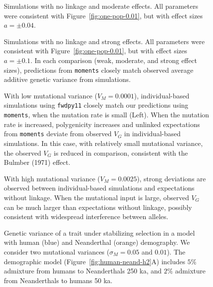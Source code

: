 \documentclass[10pt,letterpaper]{article}
\newcommand{\moments}{\texttt{moments}\xspace}
\newcommand{\fwdpy}{\texttt{fwdpy11}\xspace}
\begin{document}
\begin{figure}[ht!]
    \centering
    \caption{
        Simulations with no linkage and moderate effects.
        All parameters were consistent with Figure~\ref{fig:one-pop-0.01},
        but with effect sizes $a=\pm0.04$.
    }
    \label{fig:one-pop-0.04}
\end{figure}

\begin{figure}[ht!]
    \centering
    \caption{
        Simulations with no linkage and strong effects.
        All parameters were consistent with Figure~\ref{fig:one-pop-0.01},
        but with effect sizes $a=\pm0.1$. In each comparison (weak, moderate,
        and strong effect sizes), predictions from \moments closely match
        observed average additive genetic variance from simulations.
    }
    \label{fig:one-pop-0.1}
\end{figure}


\begin{figure}[ht!]
    \centering
    \caption{
        With low mutational variance ($V_M=0.0001$), individual-based simulations
        using \fwdpy closely match our predictions using \moments, when the
        mutation rate is small (Left). When the mutation rate is increased,
        polygenicity increases and unlinked expectations from \moments deviate
        from observed $V_G$ in individual-based simulations. In this case, with
        relatively small mutational variance, the observed $V_G$ is reduced in
        comparison, consistent with the Bulmber (1971) effect.
    }
    \label{fig:supp-low-VM}
\end{figure}

\begin{figure}[ht!]
    \centering
    \caption{
        With high mutational variance ($V_M=0.0025$), strong deviations are
        observed between individual-based simulations and expectations without
        linkage. When the mutational input is large, observed $V_G$ can be
        much larger than expectations without linkage, possibly consistent with
        widespread interference between alleles.
    }
    \label{fig:supp-high-VM}
\end{figure}

\begin{figure}[t!]
    \centering
    \caption{
        Genetic variance of a trait under stabilizing selection in a model with
        human (blue) and Neanderthal (orange) demography. We consider two
        mutational variances ($\sigma_M=0.05$ and $0.01$). The demographic model
        (Figure~\ref{fig:human-neand-h2}A) includes $5\%$ admixture from humans
        to Neanderthals 250 ka, and $2\%$ admixture from Neanderthals to humans
        50 ka.
    }
    \label{fig:human-neand-VG}
\end{figure}
\end{document}
